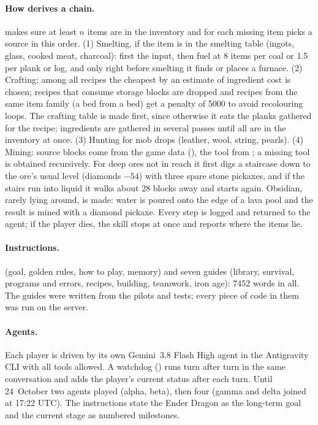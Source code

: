 \documentclass[11pt]{article}
\begin{document}
\paragraph{How  derives a chain.}  makes sure at least \(n\) items are in the inventory and for each missing item picks a source in this order. (1) Smelting, if the item is in the smelting table (ingots, glass, cooked meat, charcoal): first the input, then fuel at 8 items per coal or 1.5 per plank or log, and only right before smelting it finds or places a furnace. (2) Crafting: among all recipes the cheapest by an estimate of ingredient cost is chosen; recipes that consume storage blocks are dropped and recipes from the same item family (a bed from a bed) get a penalty of 5000 to avoid recolouring loops. The crafting table is made first, since otherwise it eats the planks gathered for the recipe; ingredients are gathered in several passes until all are in the inventory at once. (3) Hunting for mob drops (leather, wool, string, pearls). (4) Mining: source blocks come from the game data (), the tool from ; a missing tool is obtained recursively. For deep ores not in reach it first digs a staircase down to the ore's usual level (diamonds \(-54\)) with three spare stone pickaxes, and if the stairs run into liquid it walks about 28 blocks away and starts again. Obsidian, rarely lying around, is made: water is poured onto the edge of a lava pool and the result is mined with a diamond pickaxe. Every step is logged and returned to the agent; if the player dies, the skill stops at once and reports where the items lie.

\paragraph{Instructions.}  (goal, golden rules, how to play, memory) and seven guides (library, survival, programs and errors, recipes, building, teamwork, iron age): 7452 words in all. The guides were written from the pilots and tests; every piece of code in them was run on the server.

\paragraph{Agents.} Each player is driven by its own Gemini~3.8 Flash High agent in the Antigravity CLI with all tools allowed. A watchdog () runs turn after turn in the same conversation and adds the player's current status after each turn. Until 24~October two agents played (alpha, beta), then four (gamma and delta joined at 17:22 UTC). The instructions state the Ender Dragon as the long-term goal and the current stage as numbered milestones.
\end{document}
